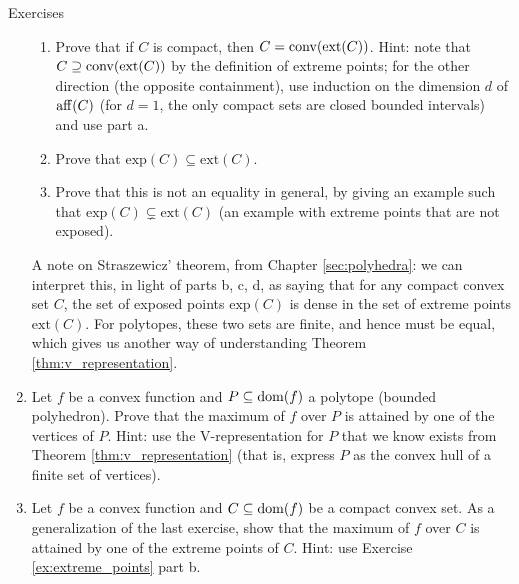 \begin{xcb}{Exercises}
\begin{enumerate}[label=\thechapter.\arabic*]
\begin{enumerate}[label=\alph*.]
\item Prove that if $C$ is compact, then $C = \operatorname{conv}(\mathrm{ext}(C))$. Hint:
  note that $C \supseteq \operatorname{conv}(\mathrm{ext}(C))$ by the definition of extreme  
  points; for the other direction (the opposite containment), use induction on
  the dimension $d$ of $\operatorname{aff}(C)$ (for $d=1$, the only compact sets are closed
  bounded intervals) and use part a. 

\item Prove that $\mathrm{exp}(C) \subseteq \mathrm{ext}(C)$. 

\item Prove that this is not an equality in general, by giving an example such 
  that $\mathrm{exp}(C) \subsetneq \mathrm{ext}(C)$ (an example with extreme
  points that are not exposed).     
\end{enumerate}

\smallskip
A note on Straszewicz' theorem, from Chapter \ref{sec:polyhedra}: we can
interpret this, in light of parts b, c, d, as saying that for any compact convex
set $C$, the set of exposed points $\mathrm{exp}(C)$ is dense in the set of
extreme points $\mathrm{ext}(C)$. For polytopes, these two sets are finite, and
hence must be equal, which gives us another way of understanding Theorem 
\ref{thm:v_representation}.  

\item Let $f$ be a convex function and $P \subseteq \operatorname{dom}(f)$ a polytope
  (bounded polyhedron). Prove that the maximum of $f$ over $P$ is attained by
  one of the vertices of $P$. Hint: use the V-representation for $P$ that we
  know exists from Theorem \ref{thm:v_representation} (that is, express $P$ as
  the convex hull of a finite set of vertices). 

\item \label{ex:convex_maximization}
  Let $f$ be a convex function and $C \subseteq \operatorname{dom}(f)$ be a compact convex
  set. As a generalization of the last exercise, show that the maximum of $f$
  over $C$ is attained by one of the extreme points of $C$. Hint: use Exercise
  \ref{ex:extreme_points} part b. 
\end{enumerate}
\end{xcb}
